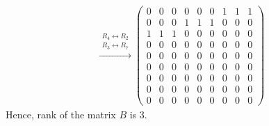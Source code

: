 \documentclass[journal,12pt,twocolumn]{IEEEtran}
\numberwithin{equation}{subsection}
\newcommand{\myvec}[1]{\ensuremath{\begin{pmatrix}#1\end{pmatrix}}}
\begin{document}
\begin{align}
 \xrightarrow{\substack{R_4\leftrightarrow R_2\\R_3\leftrightarrow R_7}} \myvec{0&0&0&0&0&0&1&1&1\\0&0&0&1&1&1&0&0&0\\1&1&1&0&0&0&0&0&0\\0&0&0&0&0&0&0&0&0\\0&0&0&0&0&0&0&0&0\\0&0&0&0&0&0&0&0&0\\0&0&0&0&0&0&0&0&0\\0&0&0&0&0&0&0&0&0\\0&0&0&0&0&0&0&0&0}
 \end{align}
Hence, rank of the matrix $B$ is 3.
\end{document}
